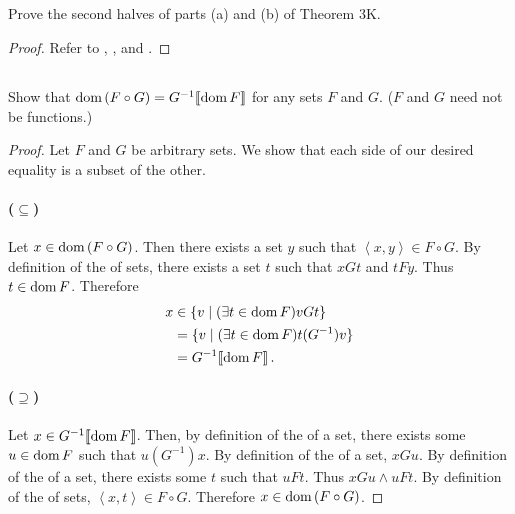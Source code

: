 \documentclass{report}
\begin{document}
\subsection{}%
\label{sub:exercise-3.26}

Prove the second halves of parts (a) and (b) of Theorem 3K.

\begin{proof}

  Refer to , , and
    .

\end{proof}

\subsection{}%
\label{sub:exercise-3.27}

Show that $\mathop{\text{dom}}{(F \circ G)} = G^{-1}\!\left\llbracket\mathop{\text{dom}}{F}\right\rrbracket$ for any sets $F$ and $G$.
($F$ and $G$ need not be functions.)

\begin{proof}

  Let $F$ and $G$ be arbitrary sets.
  We show that each side of our desired equality is a subset of the other.

  \paragraph{($\subseteq$)}%

    Let $x \in \mathop{\text{dom}}{(F \circ G)}$.
    Then there exists a set $y$ such that $\left< x, y \right> \in F \circ G$.
    By definition of the  of sets, there exists a set
      $t$ such that $xGt$ and $tFy$.
    Thus $t \in \mathop{\text{dom}}{F}$.
    Therefore
      \begin{align*}
        x
          & \in \{v \mid (\exists t \in \mathop{\text{dom}}{F}) vGt\} \\
          & = \{v \mid (\exists t \in \mathop{\text{dom}}{F}) t(G^{-1})v\} \\
          & = G^{-1}\!\left\llbracket\mathop{\text{dom}}{F}\right\rrbracket.
      \end{align*}

  \paragraph{($\supseteq$)}%

    Let $x \in G^{-1}\!\left\llbracket\mathop{\text{dom}}{F}\right\rrbracket$.
    Then, by definition of the  of a set, there exists some
      $u \in \mathop{\text{dom}}{F}$ such that $u(G^{-1})x$.
    By definition of the  of a set, $xGu$.
    By definition of the  of a set, there exists some $t$
      such that $uFt$.
    Thus $xGu \land uFt$.
    By definition of the  of sets,
      $\left< x, t \right> \in F \circ G$.
    Therefore $x \in \mathop{\text{dom}}{(F \circ G)}$.

\end{proof}
\end{document}
